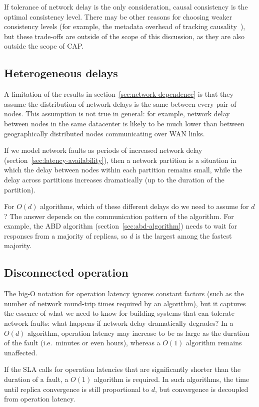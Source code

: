 \documentclass[a4paper,twocolumn,10pt]{article}
\begin{document}
If tolerance of network delay is the only consideration, causal consistency is the optimal
consistency level. There may be other reasons for choosing weaker consistency levels (for example,
the metadata overhead of tracking causality~\cite{CharronBost1991ec}), but these trade-offs are
outside of the scope of this discussion, as they are also outside the scope of CAP.

\subsection{Heterogeneous delays}

A limitation of the results in section~\ref{sec:network-dependence} is that they assume the
distribution of network delays is the same between every pair of nodes. This assumption is not true
in general: for example, network delay between nodes in the same datacenter is likely to be much
lower than between geographically distributed nodes communicating over WAN links.

If we model network faults as periods of increased network delay
(section~\ref{sec:latency-availability}), then a network partition is a situation in which the delay
between nodes within each partition remains small, while the delay across partitions increases
dramatically (up to the duration of the partition).

For $O(d)$ algorithms, which of these different delays do we need to assume for $d$? The answer
depends on the communication pattern of the algorithm. For example, the ABD algorithm
(section~\ref{sec:abd-algorithm}) needs to wait for responses from a majority of replicas, so $d$ is
the largest among the fastest majority.

\subsection{Disconnected operation}\label{sec:disconnected}

The big-O notation for operation latency ignores constant factors (such as the number of network
round-trip times required by an algorithm), but it captures the essence of what we need to know for
building systems that can tolerate network faults: what happens if network delay dramatically
degrades? In a $O(d)$ algorithm, operation latency may increase to be as large as the duration of
the fault (i.e.\ minutes or even hours), whereas a $O(1)$ algorithm remains unaffected.

If the SLA calls for operation latencies that are significantly shorter than the duration of a
fault, a $O(1)$ algorithm is required. In such algorithms, the time until replica convergence is
still proportional to $d$, but convergence is decoupled from operation latency.
\end{document}
